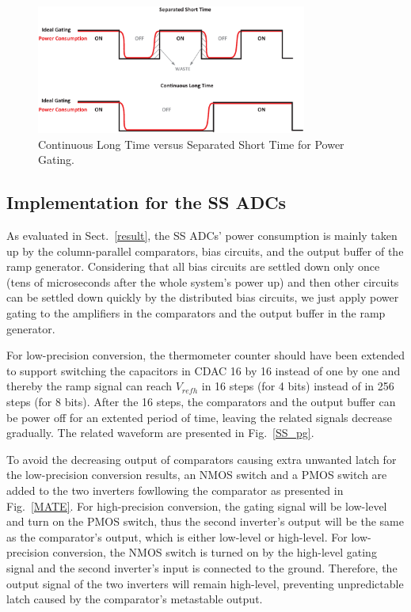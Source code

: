 \begin{figure}[htbp]
	\centerline{\includegraphics[width=3.5in]{./Figures/TIME.eps}}
	\caption{Continuous Long Time versus Separated Short Time for Power Gating.}
	\label{TIME}
\end{figure}  

\subsection{Implementation for the SS ADCs}

As evaluated in Sect.~\ref{result}, the SS ADCs’ power consumption is mainly taken up by the column-parallel comparators, bias circuits, and the output buffer of the ramp generator. 
Considering that all bias circuits are settled down only once (tens of microseconds after the whole system's power up) and then other circuits can be settled down quickly by the distributed 
bias circuits, we just apply power gating to the amplifiers in the comparators and the output buffer in the ramp generator.

For low-precision conversion, the thermometer counter should have been extended to support switching the capacitors in CDAC 16 by 16 instead of one by one and thereby the ramp signal can reach $V_{refh}$ in 16 steps (for 4 bits) instead of in 256 steps (for 8 bits). 
After the 16 steps, the comparators and the output buffer can be power off for an extented period of time, leaving the related signals decrease gradually.
The related waveform are presented in Fig.~\ref{SS_pg}. 

To avoid the decreasing output of comparators causing extra unwanted latch for the low-precision conversion results, an NMOS switch and a PMOS switch are added to the two inverters fowllowing the comparator as presented in Fig.~\ref{MATE}. 
For high-precision conversion, the gating signal will be low-level and turn on the PMOS switch, thus the second inverter's output will be the same as the comparator's output, which is either low-level or high-level. 
For low-precision conversion, the NMOS switch is turned on by the high-level gating signal and the second inverter's input is connected to the ground. Therefore, the output signal of the two inverters will remain high-level, preventing unpredictable latch caused by the comparator's metastable output.


